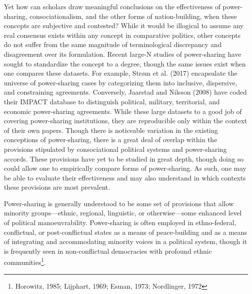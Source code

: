 \documentclass[12pt]{article}
\begin{document}
Yet how can scholars draw meaningful conclusions on the effectiveness of power-sharing, consociationalism, and the other forms of nation-building, when these concepts are subjective and contested? While it would be illogical to assume any real consensus exists within any concept in comparative politics, other concepts do not suffer from the same magnitude of terminological discrepancy and disagreement over its formulation. Recent large-N studies of power-sharing have sought to standardize the concept to a degree, though the same issues exist when one compares these datasets. For example, Strøm et al. (2017) encapsulate the universe of power-sharing cases by categorizing them into inclusive, dispersive, and constraining agreements. Conversely, Jaarstad and Nilsson (2008) have coded their IMPACT database to distinguish political, military, territorial, and economic power-sharing agreements. While these large datasets to a good job of covering power-sharing institutions, they are reproducible only within the context of their own papers. Though there is noticeable variation in the existing conceptions of power-sharing, there is a great deal of overlap within the provisions stipulated by consociational political systems and power-sharing accords. These provisions have yet to be studied in great depth, though doing so could allow one to empirically compare forms of power-sharing. As such, one may be able to evaluate their effectiveness and may also understand in which contexts these provisions are most prevalent. 

Power-sharing is generally understood to be some set of provisions that allow minority groups---ethnic, regional, linguistic, or otherwise---some enhanced level of political manoeuvrability. Power-sharing is often employed in ethno-federal, conflictual, or post-conflictual states as a means of peace-building and as a means of integrating and accommodating minority voices in a political system, though it is frequently seen in non-conflictual democracies with profound ethnic communities\footnote{Horowitz, 1985; Lijphart, 1969; Esman, 1973; Nordlinger, 1972}. 
\end{document}
